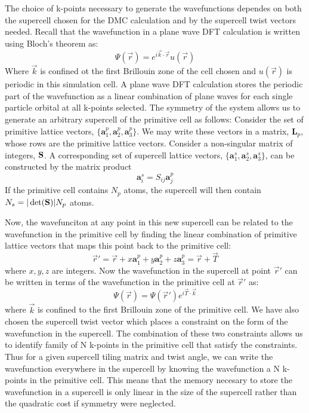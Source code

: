 The choice of k-points necessary to generate the wavefunctions dependes on both the supercell chosen for the DMC calculation and by the supercell twist vectors needed.  Recall that the wavefunction in a plane wave DFT calculation is written using Bloch's theorem as:
\begin{equation}
\Psi(\vec{r}) = e^{i\vec{k}\cdot\vec{r}}u(\vec{r})
\end{equation}
Where $\vec{k}$ is confined ot the first Brillouin zone of the cell chosen and $u(\vec{r})$ is periodic in this simulation cell.  A plane wave DFT calculation stores the periodic part of the wavefunction as a linear combination of plane waves for each single particle orbital at all k-points selected.  The symmetry of the system allows us to generate an arbitrary supercell of the primitive cell as follows:  Consider the set of primitive lattice vectors, $ \{ \mathbf{a}^p_1, \mathbf{a}^p_2,
\mathbf{a}^p_3\} $.  We may write these vectors in a matrix, $\mathbf{L}_p$, whose
rows are the primitive lattice vectors.  Consider a non-singular
matrix of integers, $\mathbf{S}$.  A corresponding set of supercell lattice
vectors, $\{\mathbf{a}^s_1, \mathbf{a}^s_2, \mathbf{a}^s_3\}$, can be constructed by the matrix
product 
\begin{equation}
\mathbf{a}^s_i = S_{ij} \mathbf{a}^p_j
\end{equation}
If the primitive cell contains $N_p$ atoms, the supercell will then
contain $N_s = |\det(\mathbf{S})| N_p$ atoms.

Now, the wavefunciton at any point in this new supercell can be related to the wavefunction in the primitive cell by  finding the linear combination of primitive lattice vectors that maps this point back to the primitive cell:
\begin{equation}
\vec{r}' = \vec{r} + x \mathbf{a}^p_1 + y \mathbf{a}^p_2 + z\mathbf{a}^p_3 = \vec{r} + \vec{T}
\end{equation}
where $x, y, z$ are integers.   Now the wavefunction in the supercell at point $\vec{r}'$ can be written in terms of the wavefunction in the primitive cell at $\vec{r}'$ as:
\begin{equation}
\Psi(\vec{r}) = \Psi(\vec{r}') e^{i \vec{T} \cdot \vec{k}}
\end{equation}
where $\vec{k}$ is confined to the first Brillouin zone of the primitive cell.  We have also chosen the supercell twist vector which places a constraint on the form of the wavefunction in the supercell.  The combination of these two constraints allows us to identify family of N k-points in the primitive cell that satisfy the constraints.  Thus for a given supercell tiling matrix and twist angle, we can write the wavefunction everywhere in the supercell by knowing the wavefunction a N k-points in the primitive cell.  This means that the memory necesary to store the wavefunction in a supercell is only linear in the size of the supercell rather than the quadratic cost if symmetry were neglected.

